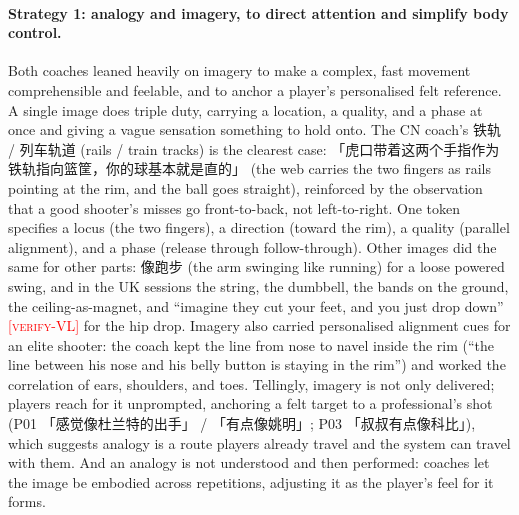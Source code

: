 \documentclass[sigconf]{acmart}
\newcommand{\vf}[1]{\textcolor{red}{[\textsc{#1}]}}
\begin{document}
\paragraph{Strategy 1: analogy and imagery, to direct attention and simplify body control.} Both coaches leaned heavily on imagery to make a complex, fast movement comprehensible and feelable, and to anchor a player's personalised felt reference. A single image does triple duty, carrying a location, a quality, and a phase at once and giving a vague sensation something to hold onto. The CN coach's 铁轨 / 列车轨道 (rails / train tracks) is the clearest case: 「虎口带着这两个手指作为铁轨指向篮筐，你的球基本就是直的」 (the web carries the two fingers as rails pointing at the rim, and the ball goes straight), reinforced by the observation that a good shooter's misses go front-to-back, not left-to-right. One token specifies a locus (the two fingers), a direction (toward the rim), a quality (parallel alignment), and a phase (release through follow-through). Other images did the same for other parts: 像跑步 (the arm swinging like running) for a loose powered swing, and in the UK sessions the string, the dumbbell, the bands on the ground, the ceiling-as-magnet, and ``imagine they cut your feet, and you just drop down'' \vf{verify-VL} for the hip drop. Imagery also carried personalised alignment cues for an elite shooter: the coach kept the line from nose to navel inside the rim (``the line between his nose and his belly button is staying in the rim'') and worked the correlation of ears, shoulders, and toes. Tellingly, imagery is not only delivered; players reach for it unprompted, anchoring a felt target to a professional's shot (P01 「感觉像杜兰特的出手」 / 「有点像姚明」; P03 「叔叔有点像科比」), which suggests analogy is a route players already travel and the system can travel with them. And an analogy is not understood and then performed: coaches let the image be embodied across repetitions, adjusting it as the player's feel for it forms.
\end{document}
